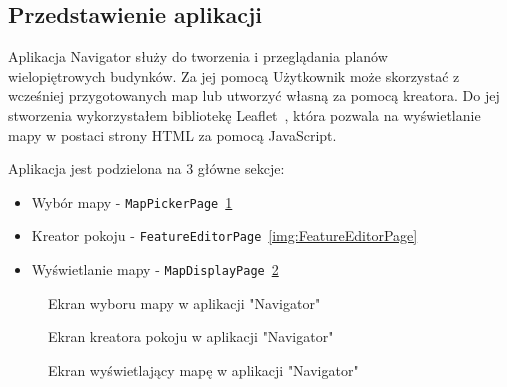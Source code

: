\subsection{Przedstawienie aplikacji}

Aplikacja Navigator służy do tworzenia i przeglądania planów\\%
wielopiętrowych budynków.
Za jej pomocą Użytkownik może skorzystać z wcześniej przygotowanych map lub utworzyć własną za pomocą kreatora.
Do jej stworzenia wykorzystałem bibliotekę Leaflet~\cite{leafletGithub}, 
która pozwala na wyświetlanie mapy w postaci strony HTML za pomocą JavaScript.

Aplikacja jest podzielona na 3 główne sekcje: 
\begin{itemize}
    \item Wybór mapy - \verb|MapPickerPage|~\ref{img:MapPickerPage}
    \item Kreator pokoju - \verb|FeatureEditorPage|~\ref{img:FeatureEditorPage}
    \item Wyświetlanie mapy - \verb|MapDisplayPage|~\ref{img:MapDisplayPage}
\end{itemize}

\begin{figure}[h]
    \centering
    \caption{Ekran wyboru mapy w aplikacji "Navigator"}
    \label{img:MapPickerPage}
\end{figure}

\begin{figure}[ht]
    \centering
    \begin{minipage}[b]{0.6\textwidth}
      \caption{Ekran kreatora pokoju w aplikacji "Navigator"}
      \label{img:FeatureEditorPage}
    \end{minipage}
    \hfill
    \begin{minipage}[b]{0.39\textwidth}
        \caption{Ekran wyświetlający mapę w aplikacji "Navigator"}
        \label{img:MapDisplayPage}
    \end{minipage}
\end{figure}
